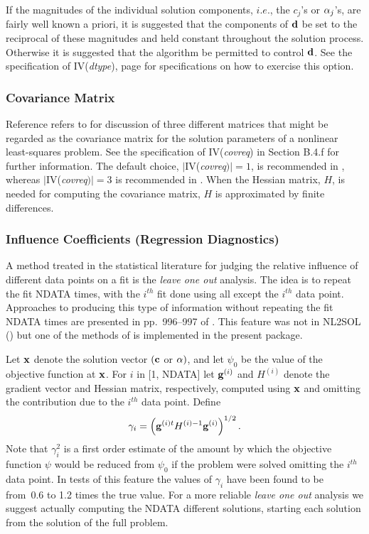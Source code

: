 \documentclass[twoside]{MATH77}
\begin{document}
If the magnitudes of the individual solution components, $i.e.$, the $%
c_j$'s or ${\bf \alpha }_j$'s, are fairly well known a priori,
it is suggested that the components of ${\bf d}$ be set to the reciprocal of
these magnitudes and held constant throughout the solution process.
Otherwise it is suggested that the algorithm be permitted to control ${\bf d}$. See
the specification of IV({\em dtype}), page \pageref{dtype} for specifications on
how to exercise this option.

\subsubsection{Covariance Matrix}

Reference \cite{Dennis:1981:ANL} refers to \cite{Bard:1974:NPE} for
discussion of three different matrices that might be regarded as the
covariance matrix for the solution parameters of a nonlinear least-squares
problem.  See the specification of IV({\em covreq}) in Section B.4.f for
further information.  The default choice, $|$IV({\em covreq}$)| = 1$, is
recommended in \cite{Dennis:1981:ANL}, whereas $|$IV({\em covreq}$)| = 3$
is recommended in \cite{Donaldson:1987:CEC}.  When the Hessian matrix,
$H$, is needed for computing the covariance matrix, $H$ is approximated by
finite differences.

\subsubsection{Influence Coefficients (Regression Diagnostics)}

A method treated in the statistical literature for judging the relative
influence of different data points on a fit is the {\em leave one out}
analysis.  The idea is to repeat the fit NDATA times, with the $i^{th}$
fit done using all except the $i^{th}$ data point.  Approaches to
producing this type of information without repeating the fit NDATA times
are presented in pp.~996--997 of \cite{Gay:1988:MLQ}.  This feature was
not in NL2SOL (\cite{Dennis:1981:ANL}) but one of the methods of
\cite{Gay:1988:MLQ} is implemented in the present package.

Let ${\bf x}$ denote the solution vector $({\bf c}$ or ${\bf \alpha })$,
and let $\psi _0$ be the value of the objective function at ${\bf x}$.
For $i$ in [1, NDATA] let ${\bf g}^{(i)}$ and $H^{(i)}$ denote the
gradient vector and Hessian matrix, respectively, computed using ${\bf x}$
and omitting the contribution due to the $i^{th}$ data point.  Define
\begin{equation} \label{O23}\gamma _i=\left( {\bf g}^{(i)t}H^{(i)-1}{\bf
g}^{(i)}\right) ^{1/2}.  \end{equation} Note that $\gamma _i^2$ is a first
order estimate of the amount by which the objective function $\psi $ would
be reduced from $\psi _0$ if the problem were solved omitting the $i^{th}$
data point.  In tests of this feature the values of $\gamma _i$ have been
found to be from~0.6 to 1.2 times the true value.  For a more reliable
{\em leave one out} analysis we suggest actually computing the NDATA
different solutions, starting each solution from the solution of the full
problem.
\end{document}
